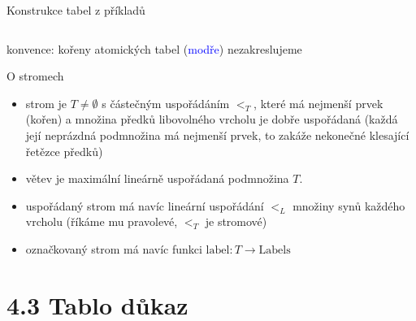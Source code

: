 \documentclass{beamer}
\begin{document}
\begin{frame}{Konstrukce tabel z příkladů}
\begin{center}
{\begin{columns}
    \end{columns}

    }


    \alert{konvence:} kořeny atomických tabel (\textcolor{blue}{modře}) nezakreslujeme   

    \end{center}    

\end{frame}


\begin{frame}{O stromech}
    
    \begin{itemize}
        \item \alert{strom} je $T\neq\emptyset$ s částečným uspořádáním $<_T$, které má nejmenší prvek (\alert{kořen}) a množina předků libovolného vrcholu je \alert{dobře uspořádaná} (každá její neprázdná podmnožina má nejmenší prvek, to zakáže nekonečné klesající řetězce předků)
        \item \alert{větev} je maximální lineárně uspořádaná podmnožina $T$.
        \item \alert{uspořádaný strom} má navíc lineární uspořádání $<_L$ množiny synů každého vrcholu (říkáme mu \alert{pravolevé}, $<_T$ je \alert{stromové})
        \item \alert{označkovaný strom} má navíc funkci $\mathrm{label}\colon T\to\mathrm{Labels}$        
    \end{itemize}


\end{frame}


\section{4.3 Tablo důkaz}
\end{document}
